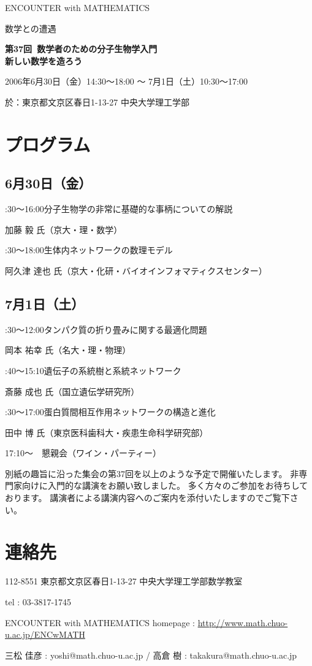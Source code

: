 \documentclass[uplatex,dvipdfmx]{jlreq}
\newcommand{\talk}[3]{%
\noindent
#1\quad #2\par
\hspace*{2em}#3\par\smallskip
}
\newcommand{\EwMnumber}{第37回}
\newcommand{\EwMtitle}{数学者のための分子生物学入門\\[2mm]\large 新しい数学を造ろう}
\newcommand{\EwMdate}{2006年6月30日（金）14:30～18:00 ～ 7月1日（土）10:30～17:00}
\newcommand{\EwMplace}{東京都文京区春日1-13-27 中央大学理工学部}
\newcommand{\EwMtitleblock}{

\vspace*{-5mm}

\begin{center}

{\Large ENCOUNTER with MATHEMATICS}

\vspace{2mm}

{\large 数学との遭遇}

\vspace{4mm}

{\Large \bfseries \EwMnumber\ \EwMtitle}

\vspace{4mm}

\EwMdate

\vspace{2mm}

於：\EwMplace

\end{center}

\vspace{2mm}

}
\begin{document}
\EwMtitleblock


\section*{プログラム}

\subsection*{6月30日（金）}

\talk
{14:30～16:00}
{分子生物学の非常に基礎的な事柄についての解説}
{加藤 毅 氏（京大・理・数学）}

\talk
{16:30～18:00}
{生体内ネットワークの数理モデル}
{阿久津 達也 氏（京大・化研・バイオインフォマティクスセンター）}

\subsection*{7月1日（土）}

\talk
{10:30～12:00}
{タンパク質の折り畳みに関する最適化問題}
{岡本 祐幸 氏（名大・理・物理）}

\talk
{13:40～15:10}
{遺伝子の系統樹と系統ネットワーク}
{斎藤 成也 氏（国立遺伝学研究所）}

\talk
{15:30～17:00}
{蛋白質間相互作用ネットワークの構造と進化}
{田中 博 氏（東京医科歯科大・疾患生命科学研究部）}

\bigskip

17:10～　懇親会（ワイン・パーティー）


\bigskip

別紙の趣旨に沿った集会の第37回を以上のような予定で開催いたします。  
非専門家向けに入門的な講演をお願い致しました。  
多く方々のご参加をお待ちしております。  
講演者による講演内容へのご案内を添付いたしますのでご覧下さい。


\section*{連絡先}

112-8551 東京都文京区春日1-13-27 中央大学理工学部数学教室 

tel : 03-3817-1745  

ENCOUNTER with MATHEMATICS  
homepage : \url{http://www.math.chuo-u.ac.jp/ENCwMATH}  

三松 佳彦 : yoshi@math.chuo-u.ac.jp / 高倉 樹 : takakura@math.chuo-u.ac.jp
\end{document}
